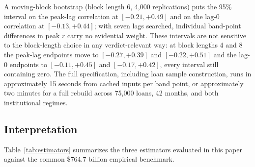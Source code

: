 \documentclass[12pt]{article}
\begin{document}
A moving-block bootstrap (block length 6, 4,000 replications) puts the 95\% interval on the peak-lag correlation at $[-0.21, +0.49]$ and on the lag-0 correlation at $[-0.13, +0.44]$; with seven lags searched, individual band-point differences in peak $r$ carry no evidential weight. These intervals are not sensitive to the block-length choice in any verdict-relevant way: at block lengths 4 and 8 the peak-lag endpoints move to $[-0.27, +0.39]$ and $[-0.22, +0.51]$ and the lag-0 endpoints to $[-0.11, +0.45]$ and $[-0.17, +0.42]$, every interval still containing zero. The full specification, including loan sample construction, runs in approximately 15 seconds from cached inputs per band point, or approximately two minutes for a full rebuild across 75,000 loans, 42 months, and both institutional regimes.

\subsection{Interpretation}\label{sec:hazard-interp}

Table~\ref{tab:estimators} summarizes the three estimators evaluated in this paper against the common \$764.7 billion empirical benchmark.
\end{document}
